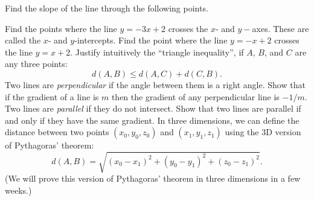 \begin{questions}
  \question Find the slope of the line through the following points.
  \question Find the points where the line $ y = -3x + 2 $ crosses the $ x$- and $ y-$axes. These are called the $ x$- and $ y$-intercepts.
  \question Find the point where the line $ y = -x + 2 $ crosses the line $ y = x + 2 $.
  \question Justify intuitively the ``triangle inequality'', if $ A $, $ B $, and $ C $ are any three points:
            \begin{equation}
              d(A,B) \leq d(A,C) + d(C,B). \tag{Triangle inequality}
            \end{equation}
  \question Two lines are \emph{perpendicular} if the angle between them is a right angle. Show that if the gradient of a line is $ m $
            then the gradient of any perpendicular line is $ -1/m $.
  \question Two lines are \emph{parallel} if they do not intersect. Show that two lines are parallel if and only if they have the same gradient.
  \question In three dimensions, we can define the distance between two points $ (x_0,y_0,z_0) $ and $ (x_1,y_1,z_1) $ using the 3D version
            of Pythagoras' theorem:
            \begin{displaymath}
              d(A,B) = \sqrt{(x_0 - x_1)^2 + (y_0 - y_1)^2 + (z_0 - z_1)^2}.
            \end{displaymath}
            (We will prove this version of Pythagoras' theorem in three dimensions in a few weeks.)
    \begin{parts}

\end{parts}
\end{questions}
